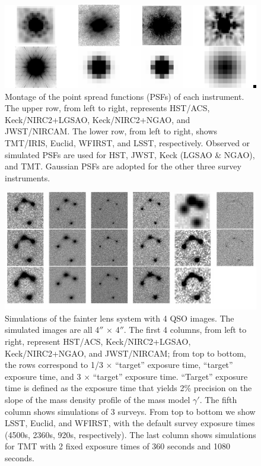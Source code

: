\documentclass[a4paper,11pt]{article}
\begin{document}
{%
\begin{figure}
\begin{center}
\includegraphics[width=1.0\textwidth]{figures/PSF_montage.png}
\end{center}
\caption{Montage of the point spread functions (PSFs) of each instrument. The upper row, from left to right, represents HST/ACS, Keck/NIRC2+LGSAO, Keck/NIRC2+NGAO, and JWST/NIRCAM. The lower row, from left to right, shows TMT/IRIS, Euclid, WFIRST, and LSST, respectively. Observed or simulated PSFs are used for HST, JWST, Keck (LGSAO \& NGAO), and TMT. Gaussian PSFs are adopted for the other three survey instruments.}
\label{fig:PSF_montage}
\end{figure}



\begin{figure}
\begin{center}
\includegraphics[width=1.0\textwidth]{figures/fainter_system_4QSOimages_all.png}
\end{center}
\caption{Simulations of the fainter lens system with 4 QSO images. The simulated images are all 4$''$ $\times$ 4$''$. The first 4 columns, from left to right, represent HST/ACS, Keck/NIRC2+LGSAO, Keck/NIRC2+NGAO, and JWST/NIRCAM; from top to bottom, the rows correspond to 1/3 $\times$ ``target'' exposure time, ``target'' exposure time, and 3 $\times$ ``target'' exposure time. ``Target'' exposure time is defined as the exposure time that yields 2\% precision on the slope of the mass density profile of the mass model $\gamma'$. The fifth column shows simulations of 3 surveys. From top to bottom we show LSST, Euclid, and WFIRST, with the default survey exposure times (4500s, 2360s, 920s, respectively). The last column shows simulations for TMT with 2 fixed exposure times of 360 seconds and 1080 seconds.}
\label{fig:fainter_4QSOimages_montage}
\end{figure}


}
\end{document}
